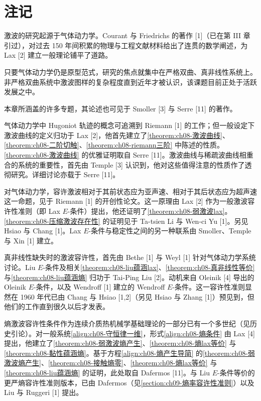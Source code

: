 \documentclass[../../main.tex]{subfiles}
\begin{document}
\section{注记}\label{section:ch08-注记}

激波的研究起源于气体动力学。Courant 与 Friedrichs 的著作 [1]（已在第 III 章引过），对过去 150 年间积累的物理与工程文献材料给出了连贯的数学阐述，为 Lax [2] 建立一般理论铺平了道路。

只要气体动力学仍是原型范式，研究的焦点就集中在严格双曲、真非线性系统上。非严格双曲系统中激波图样的复杂程度直到近年才被认识，该课题目前正处于活跃发展之中。

本章所涵盖的许多专题，其论述也可见于 Smoller [3] 与 Serre [11] 的著作。

气体动力学中 Hugoniot 轨迹的概念可追溯到 Riemann [1] 的工作；但一般设定下激波曲线的定义归功于 Lax [2]，他首先建立了\cref{theorem:ch08-激波曲线}、\cref{theorem:ch08-二阶切触}、\cref{theorem:ch08-riemann三阶} 中陈述的性质。\cref{theorem:ch08-激波曲线} 的优雅证明取自 Serre [11]。激波曲线与稀疏波曲线相重合的系统的重要性，首先由 Temple [3] 认识到，他对这些值得注意的性质作了透彻研究。详细讨论亦载于 Serre [11]。

对气体动力学，容许激波相对于其前状态应为亚声速、相对于其后状态应为超声速这一命题，见于 Riemann [1] 的开创性论文。这一原理由 Lax [2] 作为一般激波容许性准则（即 Lax $E$-条件）提出，他还证明了\cref{theorem:ch08-弱激波lax}。\cref{theorem:ch08-压缩激波存在性} 的证明见于 Ta-tsien Li 与 Wen-ci Yu [1]。另见 Hsiao 与 Chang [1]。Lax $E$-条件与稳定性之间的另一种联系由 Smoller、Temple 与 Xin [1] 建立。

真非线性缺失时的激波容许性，首先由 Bethe [1] 与 Weyl [1] 针对气体动力学系统讨论。Liu $E$-条件及相关\cref{theorem:ch08-liu蕴涵lax}、\cref{theorem:ch08-真非线性等价} 与\cref{theorem:ch08-liu蕴涵熵} 归功于 Tai-Ping Liu [2]。动机来自 Oleinik [4] 导出的 Oleinik $E$-条件，以及 Wendroff [1] 建立的 Wendroff $E$-条件。这一容许性准则显然在 1960 年代已由 Chang 与 Hsiao [1,2]（另见 Hsiao 与 Zhang [1]）预见到，但他们的工作直到很久以后才发表。

熵激波容许性条件作为连续介质热机械学基础理论的一部分已有一个多世纪（见历史引论）。对一般系统\eqref{align:ch08-守恒律一维}，形式\eqref{align:ch08-熵条件} 由 Lax [4] 提出，他建立了\cref{theorem:ch08-弱激波熵产生}、\cref{theorem:ch08-熵lax等价} 与\cref{theorem:ch08-黏性蕴涵熵}。基于方程\eqref{align:ch08-熵产生导简} 的\cref{theorem:ch08-弱激波熵产生}、\cref{theorem:ch08-接触熵零}、\cref{theorem:ch08-熵lax等价} 与\cref{theorem:ch08-liu蕴涵熵} 的证明，此处取自 Dafermos [11]。与 Liu $E$-条件等价的更严熵容许性准则版本，已由 Dafermos（见\cref{section:ch09-熵率容许性准则}）以及 Liu 与 Ruggeri [1] 提出。
\end{document}
